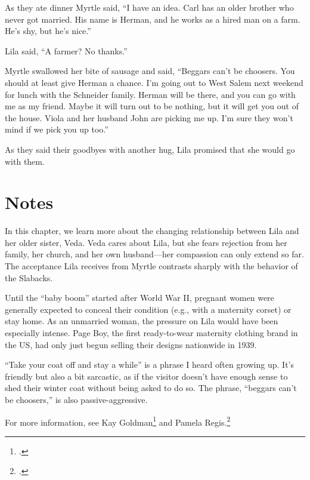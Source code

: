 \documentclass[
  american,
  letterpaper,
]{book}
\begin{document}
As they ate dinner Myrtle said, ``I have an idea. Carl has an older
brother who never got married. His name is Herman, and he works as a
hired man on a farm. He's shy, but he's nice.''

Lila said, ``A farmer? No thanks.''

Myrtle swallowed her bite of sausage and said, ``Beggars can't be
choosers. You should at least give Herman a chance. I'm going out to
West Salem next weekend for lunch with the Schneider family. Herman will
be there, and you can go with me as my friend. Maybe it will turn out to
be nothing, but it will get you out of the house. Viola and her husband
John are picking me up. I'm sure they won't mind if we pick you up
too.''

As they said their goodbyes with another hug, Lila promised that she
would go with them.

\section{Notes}\label{notes-33}

In this chapter, we learn more about the changing relationship between
Lila and her older sister, Veda. Veda cares about Lila, but she fears
rejection from her family, her church, and her own husband---her
compassion can only extend so far. The acceptance Lila receives from
Myrtle contrasts sharply with the behavior of the Slabacks.

Until the ``baby boom'' started after World War II, pregnant women were
generally expected to conceal their condition (e.g., with a maternity
corset) or stay home. As an unmarried woman, the pressure on Lila would
have been especially intense. Page Boy, the first ready-to-wear
maternity clothing brand in the US, had only just begun selling their
designs nationwide in 1939.

``Take your coat off and stay a while'' is a phrase I heard often
growing up. It's friendly but also a bit sarcastic, as if the visitor
doesn't have enough sense to shed their winter coat without being asked
to do so. The phrase, ``beggars can't be choosers,'' is also
passive-aggressive.

For more information, see Kay Goldman\footnote{.} and Pamela
Regis.\footnote{.}
\end{document}
